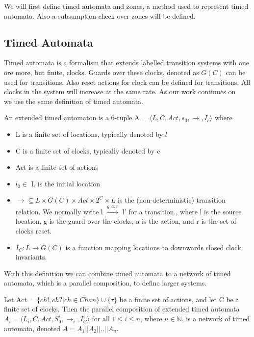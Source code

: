 We will first define timed automata and zones, a method used to represent timed automata. Also a subsumption check over zones will be defined. 

\subsection{Timed Automata}
Timed automata is a formalism that extends labelled transition systems with one ore more, but finite, clocks. Guards over these clocks, denoted as $G(C)$ can be used for transitions. Also reset actions for clock can be defined for transitions. All clocks in the system will increase at the same rate. As our work continues on ~\cite{eemcs21972} we use the same definition of timed automata.

\begin{mydef}
\label{def:TA}
An extended timed automaton is a 6-tuple A = $\langle L, C, Act, s_0, \rightarrow, I_c\rangle$ where
{\renewcommand\labelitemi{--}
	\begin{itemize}
		\item L is a finite set of locations, typically denoted by $l$
		\item C is a finite set of clocks, typically denoted by c
		\item Act is a finite set of actions
		\item $l_0 \in$ L is the initial location
		\item $\rightarrow \subseteq L \times G(C) \times Act \times 2^C \times L$ is the (non-deterministic) transition relation. We normally write l $\stackrel{g,a,r}{\longrightarrow}$ l' for a transition., where l is the source location, g is the guard over the clocks, a is the action, and r is the set of clocks reset.
		\item $I_C : L \rightarrow G(C)$ is a function mapping locations to downwards closed clock invariants.
	\end{itemize}
}
\end{mydef}

With this definition we can combine timed automata to a network of timed automata, which is a parallel composition, to define larger systems.

\begin{mydef}
\label{def:networkTA}
Let Act = $\{ch!,ch?|ch \in Chan\} \cup \{\tau\}$ be a finite set of actions, and let C be a finite set of clocks. Then the parallel composition of extended timed automata $A_i = \langle L_i, C, Act, S^i_0, \rightarrow_{i}, I^i_C\rangle$ for all $1 \leq i \leq n$, where $n \in \mathbb{N}$, is a network of timed automata, denoted $A = A_1||A_2||..||A_n$.
\end{mydef}

